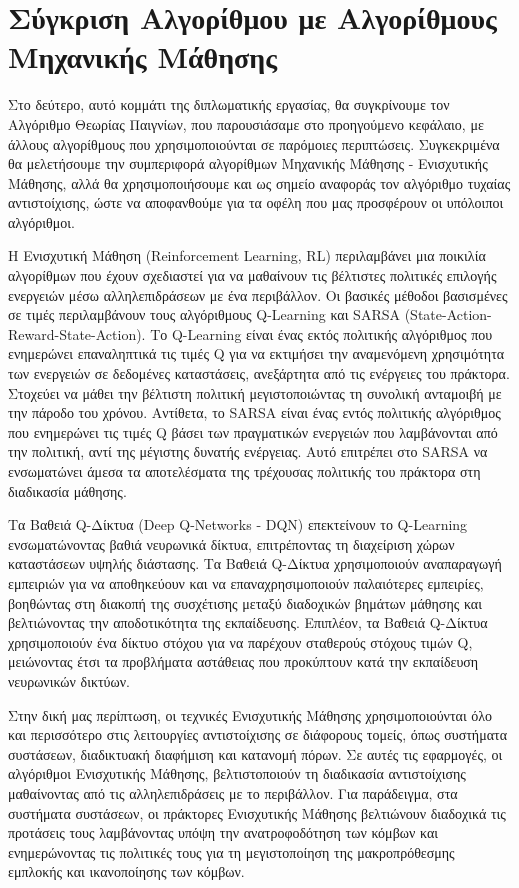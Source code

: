 \chapter{Σύγκριση Αλγορίθμου με Αλγορίθμους Μηχανικής Μάθησης}

Στο δεύτερο, αυτό κομμάτι της διπλωματικής εργασίας, θα συγκρίνουμε τον Αλγόριθμο Θεωρίας Παιγνίων, που παρουσιάσαμε στο προηγούμενο κεφάλαιο, με άλλους αλγορίθμους που χρησιμοποιούνται σε παρόμοιες περιπτώσεις. Συγκεκριμένα θα μελετήσουμε την συμπεριφορά αλγορίθμων Μηχανικής Μάθησης - Ενισχυτικής Μάθησης, αλλά θα χρησιμοποιήσουμε και ως σημείο αναφοράς τον αλγόριθμο τυχαίας αντιστοίχισης, ώστε να αποφανθούμε για τα οφέλη που μας προσφέρουν οι υπόλοιποι αλγόριθμοι.

Η Ενισχυτική Μάθηση (Reinforcement Learning, RL) περιλαμβάνει μια ποικιλία αλγορίθμων που έχουν σχεδιαστεί για να μαθαίνουν τις βέλτιστες πολιτικές επιλογής ενεργειών μέσω αλληλεπιδράσεων με ένα περιβάλλον. Οι βασικές μέθοδοι βασισμένες σε τιμές περιλαμβάνουν τους αλγόριθμους Q-Learning και SARSA (State-Action-Reward-State-Action). Το Q-Learning είναι ένας εκτός πολιτικής αλγόριθμος που ενημερώνει επαναληπτικά τις τιμές Q για να εκτιμήσει την αναμενόμενη χρησιμότητα των ενεργειών σε δεδομένες καταστάσεις, ανεξάρτητα από τις ενέργειες του πράκτορα. Στοχεύει να μάθει την βέλτιστη πολιτική μεγιστοποιώντας τη συνολική ανταμοιβή με την πάροδο του χρόνου. Αντίθετα, το SARSA είναι ένας εντός πολιτικής αλγόριθμος που ενημερώνει τις τιμές Q βάσει των πραγματικών ενεργειών που λαμβάνονται από την πολιτική, αντί της μέγιστης δυνατής ενέργειας. Αυτό επιτρέπει στο SARSA να ενσωματώνει άμεσα τα αποτελέσματα της τρέχουσας πολιτικής του πράκτορα στη διαδικασία μάθησης.

Τα Βαθειά Q-Δίκτυα (Deep Q-Networks - DQN) επεκτείνουν το Q-Learning ενσωματώνοντας βαθιά νευρωνικά δίκτυα, επιτρέποντας τη διαχείριση χώρων καταστάσεων υψηλής διάστασης. Τα Βαθειά Q-Δίκτυα χρησιμοποιούν αναπαραγωγή εμπειριών για να αποθηκεύουν και να επαναχρησιμοποιούν παλαιότερες εμπειρίες, βοηθώντας στη διακοπή της συσχέτισης μεταξύ διαδοχικών βημάτων μάθησης και βελτιώνοντας την αποδοτικότητα της εκπαίδευσης. Επιπλέον, τα Βαθειά Q-Δίκτυα χρησιμοποιούν ένα δίκτυο στόχου για να παρέχουν σταθερούς στόχους τιμών Q, μειώνοντας έτσι τα προβλήματα αστάθειας που προκύπτουν κατά την εκπαίδευση νευρωνικών δικτύων.

Στην δική μας περίπτωση, οι τεχνικές Ενισχυτικής Μάθησης χρησιμοποιούνται όλο και περισσότερο στις λειτουργίες αντιστοίχισης σε διάφορους τομείς, όπως συστήματα συστάσεων, διαδικτυακή διαφήμιση και κατανομή πόρων. Σε αυτές τις εφαρμογές, οι αλγόριθμοι Ενισχυτικής Μάθησης, βελτιστοποιούν τη διαδικασία αντιστοίχισης μαθαίνοντας από τις αλληλεπιδράσεις με το περιβάλλον. Για παράδειγμα, στα συστήματα συστάσεων, οι πράκτορες Ενισχυτικής Μάθησης βελτιώνουν διαδοχικά τις προτάσεις τους λαμβάνοντας υπόψη την ανατροφοδότηση των κόμβων και ενημερώνοντας τις πολιτικές τους για τη μεγιστοποίηση της μακροπρόθεσμης εμπλοκής και ικανοποίησης των κόμβων.

